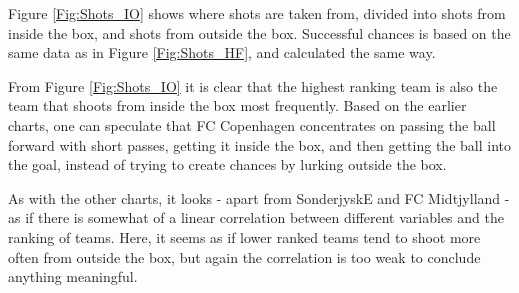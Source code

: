 \documentclass[Report.tex]{subfiles}
\begin{document}
Figure \ref{Fig:Shots_IO} shows where shots are taken from, divided into shots from inside the
box, and shots from outside the box. Successful chances is based on the same
data as in Figure \ref{Fig:Shots_HF}, and calculated the same way. 

From Figure \ref{Fig:Shots_IO} it is clear that the highest ranking team is also the team that
shoots from inside the box most frequently. Based on the earlier charts, one can
speculate that FC Copenhagen concentrates on passing the ball forward with short
passes, getting it inside the box, and then getting the ball into the goal,
instead of trying to create chances by lurking outside the box. 

As with the other charts, it looks - apart from SonderjyskE and FC Midtjylland -
as if there is somewhat of a linear correlation between different variables and
the ranking of teams. Here, it seems as if lower ranked teams tend to shoot more
often from outside the box, but again the correlation is too weak to conclude
anything meaningful. 

	
\end{document}
